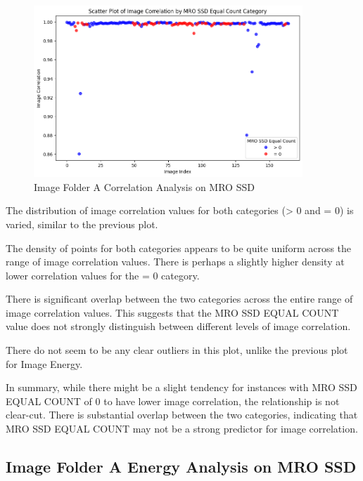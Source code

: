 \begin{figure}[ht]
    \centering
    \includegraphics[width=0.9\textwidth]{Figures/Results/sipa_02/correlation.png}
    \caption[Image Folder A Correlation Analysis on MRO SSD]{Image Folder A Correlation Analysis on MRO SSD}
    \label{fig:Image Folder A Correlation Analysis on MRO SSD}
\end{figure}

The distribution of image correlation values for both categories (> 0 and = 0) is varied, similar to the previous plot.

The density of points for both categories appears to be quite uniform across the range of image correlation values. There is perhaps a slightly higher density at lower correlation values for the = 0 category.

There is significant overlap between the two categories across the entire range of image correlation values. This suggests that the MRO SSD EQUAL COUNT value does not strongly distinguish between different levels of image correlation.

There do not seem to be any clear outliers in this plot, unlike the previous plot for Image Energy.

In summary, while there might be a slight tendency for instances with MRO SSD EQUAL COUNT of 0 to have lower image correlation, the relationship is not clear-cut. There is substantial overlap between the two categories, indicating that MRO SSD EQUAL COUNT may not be a strong predictor for image correlation.

\newpage

\subsection{Image Folder A Energy Analysis on MRO SSD}


